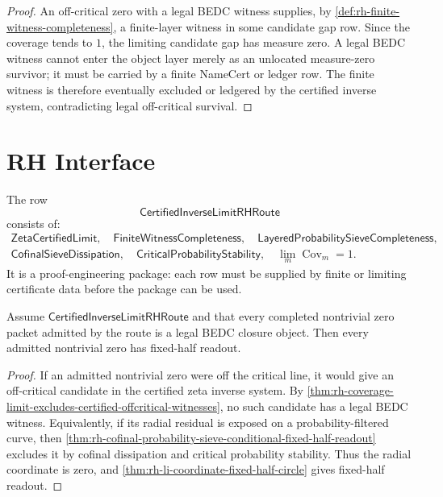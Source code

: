 \begin{proof}
An off-critical zero with a legal BEDC witness supplies, by
\autoref{def:rh-finite-witness-completeness}, a finite-layer witness in
some candidate gap row.  Since the coverage tends to $1$, the limiting
candidate gap has measure zero.  A legal BEDC witness cannot enter the
object layer merely as an unlocated measure-zero survivor; it must be
carried by a finite NameCert or ledger row.  The finite witness is
therefore eventually excluded or ledgered by the certified inverse
system, contradicting legal off-critical survival.
\end{proof}

\section{RH Interface}
\label{sec:rh-zeta-certified-inverse-limit-rh-interface}

\begin{definition}[CertifiedInverseLimitRHRoute]
\label{def:rh-certified-inverse-limit-rh-route}
The row
$$
\mathsf{CertifiedInverseLimitRHRoute}
$$
consists of:
$$
\begin{gathered}
\mathsf{ZetaCertifiedLimit},\quad
\mathsf{FiniteWitnessCompleteness},\quad
\mathsf{LayeredProbabilitySieveCompleteness},\\
\mathsf{CofinalSieveDissipation},\quad
\mathsf{CriticalProbabilityStability},\quad
\lim_m\operatorname{Cov}_m=1.
\end{gathered}
$$
It is a proof-engineering package: each row must be supplied by finite
or limiting certificate data before the package can be used.
\end{definition}

\begin{theorem}
\label{thm:rh-certified-inverse-limit-route-conditional-fixed-half}
Assume $\mathsf{CertifiedInverseLimitRHRoute}$ and that every completed
nontrivial zero packet admitted by the route is a legal BEDC closure
object.  Then every admitted nontrivial zero has fixed-half readout.
\end{theorem}

\begin{proof}
If an admitted nontrivial zero were off the critical line, it would give
an off-critical candidate in the certified zeta inverse system.  By
\autoref{thm:rh-coverage-limit-excludes-certified-offcritical-witnesses},
no such candidate has a legal BEDC witness.  Equivalently, if its
radial residual is exposed on a probability-filtered curve, then
\autoref{thm:rh-cofinal-probability-sieve-conditional-fixed-half-readout}
excludes it by cofinal dissipation and critical probability stability.
Thus the radial coordinate is zero, and
\autoref{thm:rh-li-coordinate-fixed-half-circle} gives fixed-half
readout.
\end{proof}

